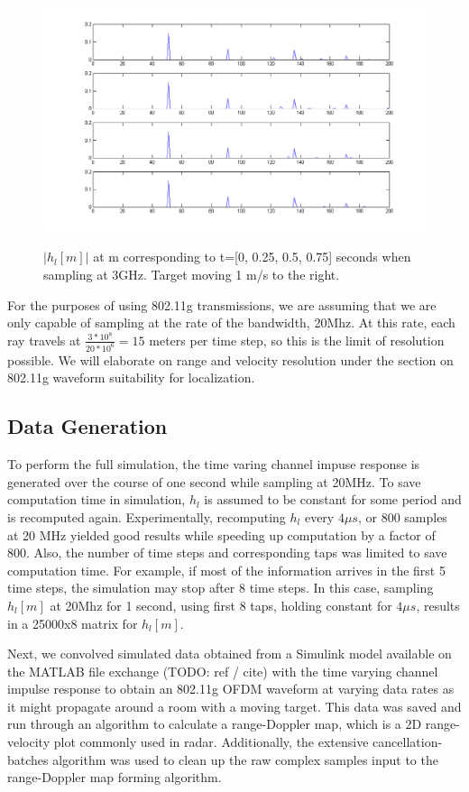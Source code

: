 \documentclass[article,11pt,onecolumn,final]{IEEEtran}
\begin{document}
\begin{figure}
\caption{$|h_l[m]|$ at m corresponding to t=[0, 0.25, 0.5, 0.75] seconds when sampling at 3GHz. Target moving 1 m/s to the right. }
\centering
\includegraphics[width=400pt]{sim/impulse_response_taps.png}  
\label{fig:Impulse Response}
\end{figure}

For the purposes of using 802.11g transmissions, we are assuming that we are only capable of sampling at the rate of the bandwidth, 20Mhz. At this rate, each ray travels at $\frac{3*10^8}{20*10^6} = 15$ meters per time step, so this is the limit of resolution possible. We will elaborate on range and velocity resolution under the section on 802.11g waveform suitability for localization.

\subsection{Data Generation}
To perform the full simulation, the time varing channel impuse response is generated over the course of one second while sampling at 20MHz. To save computation time in simulation, $h_l$ is assumed to be constant for some period and is recomputed again. Experimentally, recomputing $h_l$ every $4 \mu s$, or 800 samples at 20 MHz yielded good results while speeding up computation by a factor of 800. Also, the number of time steps and corresponding taps was limited to save computation time. For example, if most of the information arrives in the first 5 time steps, the simulation may stop after 8 time steps. In this case, sampling $h_l[m]$ at 20Mhz for 1 second, using first 8 taps, holding constant for $4 \mu s$, results in a 25000x8 matrix for $h_l[m]$.

Next, we convolved simulated data obtained from a Simulink model available on the MATLAB file exchange (TODO: ref / cite) with the time varying channel impulse response to obtain an 802.11g OFDM waveform at varying data rates as it might propagate around a room with a moving target. This data was saved and run through an algorithm to calculate a range-Doppler map, which is a 2D range-velocity plot commonly used in radar. Additionally, the extensive cancellation-batches algorithm was used to clean up the raw complex samples input to the range-Doppler map forming algorithm.
\end{document}
